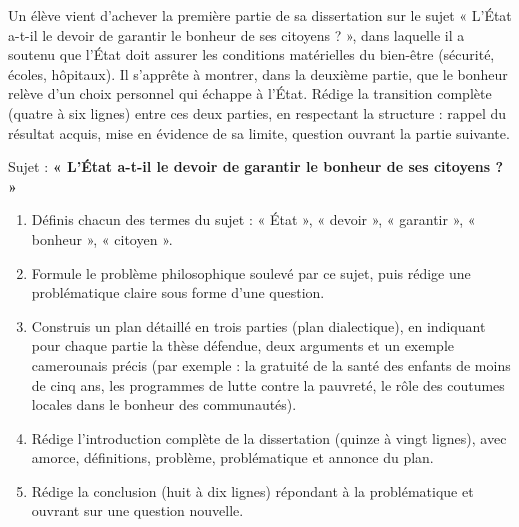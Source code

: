 \documentclass[11pt]{article}
\newcounter{popsec}
\newcounter{popsub}
\newcommand{\courssub}[1]{%
  \stepcounter{popsub}%
  \par\vspace{9pt}\noindent{\popxbold\fontsize{11.5}{13}\selectfont\color{popink}{\color{poporange}\thepopsec.\thepopsub}\hspace{6pt}#1}\par\nopagebreak\vspace{4pt}
}
\begin{document}
\begin{exercice}
Un élève vient d'achever la première partie de sa dissertation sur le sujet « L'État a-t-il le devoir de garantir le bonheur de ses citoyens ? », dans laquelle il a soutenu que l'État doit assurer les conditions matérielles du bien-être (sécurité, écoles, hôpitaux). Il s'apprête à montrer, dans la deuxième partie, que le bonheur relève d'un choix personnel qui échappe à l'État. Rédige la transition complète (quatre à six lignes) entre ces deux parties, en respectant la structure : rappel du résultat acquis, mise en évidence de sa limite, question ouvrant la partie suivante.
\end{exercice}

\courssub{Je me prépare au Bac}

\begin{exercice}
Sujet : \textbf{« L'État a-t-il le devoir de garantir le bonheur de ses citoyens ? »}
\begin{enumerate}
\item Définis chacun des termes du sujet : « État », « devoir », « garantir », « bonheur », « citoyen ».
\item Formule le problème philosophique soulevé par ce sujet, puis rédige une problématique claire sous forme d'une question.
\item Construis un plan détaillé en trois parties (plan dialectique), en indiquant pour chaque partie la thèse défendue, deux arguments et un exemple camerounais précis (par exemple : la gratuité de la santé des enfants de moins de cinq ans, les programmes de lutte contre la pauvreté, le rôle des coutumes locales dans le bonheur des communautés).
\item Rédige l'introduction complète de la dissertation (quinze à vingt lignes), avec amorce, définitions, problème, problématique et annonce du plan.
\item Rédige la conclusion (huit à dix lignes) répondant à la problématique et ouvrant sur une question nouvelle.
\end{enumerate}
\end{exercice}
\end{document}
